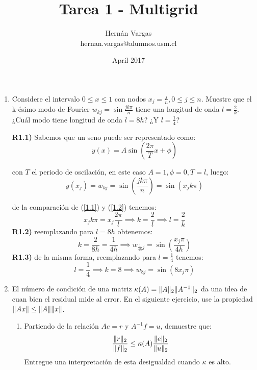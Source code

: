 \documentclass{article}
\title{Tarea 1 - Multigrid}
\author{Hernán Vargas \\ hernan.vargas@alumnos.usm.cl }
\date{April 2017}
\DeclarePairedDelimiter{\norm}{\lVert}{\rVert}
\begin{document}
\maketitle
\begin{enumerate}
    \item 
    Considere el intervalo $0 \leq x \leq 1$ con nodos $x_j = \frac{j}{n}, 0 \leq j \leq n$.
    Muestre que el k-ésimo modo de Fourier $w_{kj} = \sin{\frac{jk\pi}{n}}$ tiene una longitud de onda $l = \frac{2}{k}$.
    ¿Cuál modo tiene longitud de onda $l = 8h$? ¿Y $l = \frac{1}{4}$?
    
    \textbf{R1.1)} Sabemos que un seno puede ser representado como:
    \begin{equation}\label{1.1}
        y(x) = A\sin{(\frac{2\pi}{T}x + \phi)}
    \end{equation}
    
    con $T$ el periodo de oscilación, en este caso $A=1, \phi = 0, T=l$, luego:
    \begin{equation}\label{1.2}
        y(x_j) = w_{kj} = \sin{(\frac{jk\pi}{n})} = \sin{(x_j k\pi)}
    \end{equation}
    
    de la comparación de (\ref{1.1}) y (\ref{1.2}) tenemos:
    $$ x_jk\pi = x_j\frac{2\pi}{l} \implies k = \frac{2}{l} \implies l = \frac{2}{k} $$
    \textbf{R1.2)} reemplazando para $l=8h$ obtenemos:
    $$ k = \frac{2}{8h}=\frac{1}{4h} \implies 
       w_{\frac{1}{4h}j} = \sin{(\frac{x_j\pi}{4h})}$$
    \textbf{R1.3)} de la misma forma, reemplazando para $l=\frac{1}{4}$ tenemos:
    $$ l=\frac{1}{4} \implies k= 8 \implies w_{8j}=\sin{(8x_j\pi)}$$

    \item 
    El número de condición de una matriz $\kappa (A) = \norm{A}_2 \norm{A^{-1}}_2$ da una idea de cuan bien el residual mide al error. En el siguiente ejercicio, use la propiedad $\norm{Ax} \leq \norm{A}\norm{x}$.

    \begin{enumerate}
        \item 
        Partiendo de la relación $Ae = r$ y $A^{-1}f = u$, demuestre que:
        $$\frac{\norm{r}_2}{\norm{f}_2} \leq \kappa(A)\frac{\norm{e}_2}{\norm{u}_2}$$
        Entregue una interpretación de esta desigualdad cuando $\kappa$ es alto.
        

\end{enumerate}
\end{enumerate}
\end{document}
